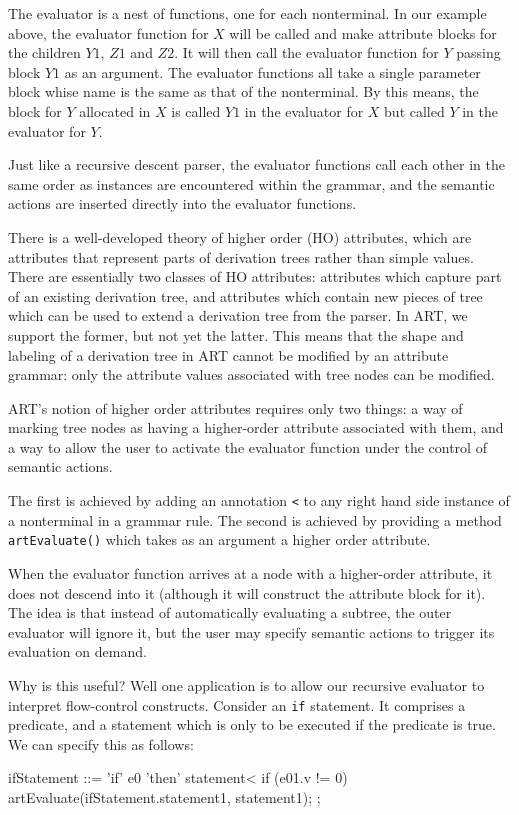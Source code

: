 The evaluator is a nest of functions, one for each nonterminal. In our
example above, the evaluator function for $X$ will be called and make
attribute blocks for the children $Y1$, $Z1$ and $Z2$. It will then
call the evaluator function for $Y$ passing block $Y1$ as an
argument. The evaluator functions all take a single parameter block
whise name is the same as that of the nonterminal. By this means, the
block for $Y$ allocated in $X$ is called $Y1$ in the evaluator for $X$
but called $Y$ in the evaluator for $Y$.

Just like a recursive descent parser, the evaluator functions call each other in
the same order as instances are encountered within the grammar, and
the semantic actions are inserted directly into the evaluator
functions.


There is a well-developed theory of higher order (HO) attributes, which are
attributes that represent parts of derivation trees rather than
simple values. There are essentially two classes of HO attributes:
attributes which capture part of an existing derivation tree, and
attributes which contain new pieces of tree which can be used to
extend a derivation tree from the parser. In ART, we support the
former, but not yet the latter. This means that the shape and
labeling of a derivation tree in ART cannot be modified by an
attribute grammar: only the attribute values associated with tree
nodes can be modified. 

ART's notion of higher order attributes requires only two things: a
way of marking tree nodes as having a higher-order attribute
associated with them, and a way to allow the user to activate the
evaluator function under the control of semantic actions.

The first is achieved by adding an annotation \verb+<+ to any right
hand side instance of a nonterminal in a grammar rule. The second is
achieved by providing a method \verb+artEvaluate()+ which takes as an
argument a higher order attribute.

When the evaluator function arrives at a node with a higher-order
attribute, it does not descend into it (although it will construct the
attribute block for it). The idea is that instead of automatically
evaluating a subtree, the outer evaluator will ignore it, but the user
may specify semantic actions to trigger its evaluation on demand.

Why is this useful? Well one application is to allow our
recursive evaluator to interpret flow-control constructs. Consider an
{\tt if} statement. It comprises a predicate, and a statement which is
only to be executed if the predicate is true. We can specify this as follows:
\begin{bnfblock}
ifStatement ::= 'if' e0 'then' statement< 
       { if (e01.v != 0)  artEvaluate(ifStatement.statement1, statement1); } ;
\end{bnfblock}

